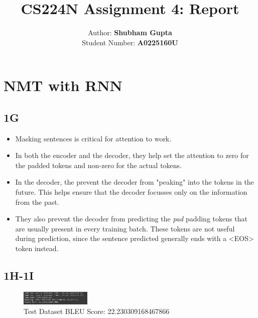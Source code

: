 \documentclass[a4paper]{article}
\title{CS224N Assignment 4: Report}
\author{Author: \textbf{Shubham Gupta}\\
    Student Number: \textbf{A0225160U}
        }
\begin{document}
\maketitle
\section{NMT with RNN}
\subsection{1G}
\begin{itemize}
    \item Masking sentences is critical for attention to work.
    \item In both the encoder and the decoder, they help set the attention to zero for the padded tokens and non-zero for the actual tokens.
    \item In the decoder, the prevent the decoder from "peaking" into the tokens in the future. This helps ensure that the decoder focusses only on the information from the past.
    \item They also prevent the decoder from predicting the \textit{pad} padding tokens that are usually present in every training batch. These tokens are not useful during prediction, since the sentence predicted generally ends with a <EOS> token instead. 
\end{itemize}
\subsection{1H-1I}
\begin{figure}[H]
    \centering
    \includegraphics[width=0.3\textwidth]{bleu_score}
    \caption{Test Dataset BLEU Score: 22.230309168467866}
    \label{fig:bleu_score}
\end{figure}
\end{document}
